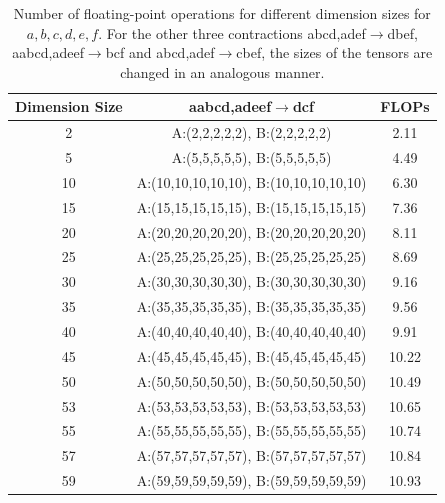 \begingroup
\scriptsize
\captionsetup{font=scriptsize}

\begin{table}[h]
    \centering
    {\tiny
    \caption{Number of floating-point operations for different dimension sizes for $a,b,c,d,e,f$. For the other three contractions abcd,adef$\rightarrow$dbef, aabcd,adeef$\rightarrow$bcf and abcd,adef$\rightarrow$cbef, the sizes of the tensors are changed in an analogous manner.}
    \label{tab:dimensions}
    \begin{tabular}{ccc}  
        \toprule
        \textbf{Dimension Size} & \textbf{aabcd,adeef}$\rightarrow$\textbf{dcf} & \textbf{FLOPs} \\
        \midrule
        2  & A:(2,2,2,2,2), B:(2,2,2,2,2) & 2.11  \\
        5  & A:(5,5,5,5,5), B:(5,5,5,5,5) & 4.49  \\
        10 & A:(10,10,10,10,10), B:(10,10,10,10,10) & 6.30  \\
        15 & A:(15,15,15,15,15), B:(15,15,15,15,15) & 7.36  \\
        20 & A:(20,20,20,20,20), B:(20,20,20,20,20) & 8.11  \\
        25 & A:(25,25,25,25,25), B:(25,25,25,25,25) & 8.69  \\
        30 & A:(30,30,30,30,30), B:(30,30,30,30,30) & 9.16  \\
        35 & A:(35,35,35,35,35), B:(35,35,35,35,35) & 9.56  \\
        40 & A:(40,40,40,40,40), B:(40,40,40,40,40) & 9.91  \\
        45 & A:(45,45,45,45,45), B:(45,45,45,45,45) & 10.22 \\
        50 & A:(50,50,50,50,50), B:(50,50,50,50,50) & 10.49 \\
        53 & A:(53,53,53,53,53), B:(53,53,53,53,53) & 10.65 \\
        55 & A:(55,55,55,55,55), B:(55,55,55,55,55) & 10.74 \\
        57 & A:(57,57,57,57,57), B:(57,57,57,57,57) & 10.84 \\
        59 & A:(59,59,59,59,59), B:(59,59,59,59,59) & 10.93 \\
        \bottomrule
    \end{tabular}}
\end{table}


